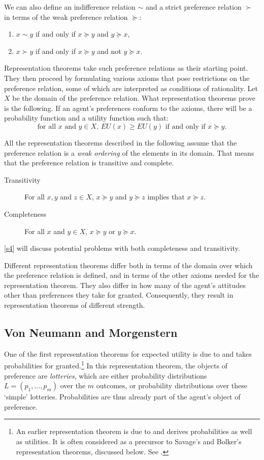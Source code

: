 We can also define an indifference relation $\sim$ and a strict preference relation $\succ$ in terms of the weak preference relation $\succcurlyeq$:
\begin{enumerate}
\item $x \sim y$ if and only if $x \succcurlyeq y$ and $y \succcurlyeq x$,
\item $x \succ y$ if and only if $x \succcurlyeq y$ and not $y \succcurlyeq x$.
\end{enumerate}
Representation theorems take such preference relations as their starting point. They then proceed by formulating various axioms that pose restrictions on the preference relation, some of which are interpreted as conditions of rationality. Let $X$ be the domain of the preference relation. What representation theorems prove is the following. If an agent's preferences conform to the axioms, there will be a probability function and a utility function such that:
$$\textrm{for all $x$ and $y \in X$, } EU(x) \geq EU(y) \textrm{ if and only if } x \succcurlyeq y.$$

All the representation theorems described in the following assume that the preference relation is a {\em weak ordering} of the elements in its domain. That means that the preference relation is transitive and complete.
\begin{description}
\item[Transitivity] For all $x, y$ and $z \in X$, $x \succcurlyeq y$ and $y \succcurlyeq z$ implies that $x \succcurlyeq z$.
\item[Completeness] For all $x$ and $y \in X$, $x \succcurlyeq y$ or $y \succcurlyeq x$.
\end{description}
\autoref{s4} will discuss potential problems with both completeness and transitivity.

Different representation theorems differ both in terms of the domain over which the preference relation is defined, and in terms of the other axioms needed for the representation theorem. They also differ in how many of the agent's attitudes other than preferences they take for granted. Consequently, they result in representation theorems of different strength.

\subsection{Von Neumann and Morgenstern}\label{subs22}

One of the first representation theorems for expected utility is due to \citet{vNM1944} and takes probabilities for granted.\footnote{An earlier representation theorem is due to \citet{Ramsey1926} and derives probabilities as well as utilities. It is often considered as a precursor to Savage's and Bolker's representation theorems, discussed below. See \citet{Bradley2004}.} In this representation theorem, the objects of preference are {\em lotteries}, which are either probability distributions $L = (p_1, ..., p_m)$ over the $m$ outcomes, or probability distributions over these `simple' lotteries. Probabilities are thus already part of the agent's object of preference.

